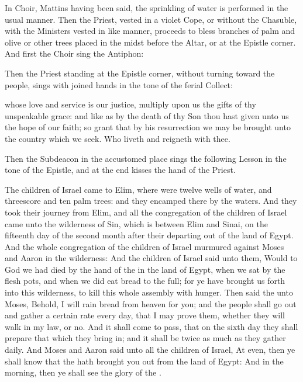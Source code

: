 \begin{rubric}
In Choir, Mattins having been said, the sprinkling of water is performed in the usual manner. Then the Priest, vested in a violet Cope, or without the Chasuble, with the Ministers vested in like manner, proceeds to bless branches of palm and olive or other trees placed in the midst before the Altar, or at the Epistle corner. And first the Choir sing the Antiphon:
\end{rubric}
\begin{rubric}
    Then the Priest standing at the Epistle corner, without turning toward the people, sings with joined hands in the tone of the ferial Collect:
\end{rubric}
{} whose love and service is our justice, multiply upon us the gifts of thy unspeakable grace: and like as by the death of thy Son thou hast given unto us the hope of our faith; so grant that by his resurrection we may be brought unto the country which we seek. Who liveth and reigneth with thee.
\begin{rubric}
    Then the Subdeacon in the accustomed place sings the following Lesson in the tone of the Epistle, and at the end kisses the hand of the Priest.
\end{rubric}
 The children of Israel came to Elim, where were twelve wells of water, and threescore and ten palm trees: and they encamped there by the waters. And they took their journey from Elim, and all the congregation of the children of Israel came unto the wilderness of Sin, which is between Elim and Sinai, on the fifteenth day of the second month after their departing out of the land of Egypt. And the whole congregation of the children of Israel murmured against Moses and Aaron in the wilderness: And the children of Israel said unto them, Would to God we had died by the hand of the  in the land of Egypt, when we sat by the flesh pots, and when we did eat bread to the full; for ye have brought us forth into this wilderness, to kill this whole assembly with hunger. Then said the  unto Moses, Behold, I will rain bread from heaven for you; and the people shall go out and gather a certain rate every day, that I may prove them, whether they will walk in my law, or no. And it shall come to pass, that on the sixth day they shall prepare that which they bring in; and it shall be twice as much as they gather daily. And Moses and Aaron said unto all the children of Israel, At even, then ye shall know that the  hath brought you out from the land of Egypt: And in the morning, then ye shall see the glory of the .
